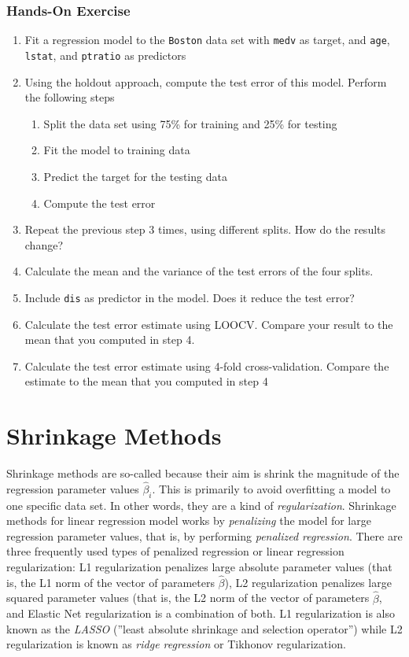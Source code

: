 \begin{tcolorbox}[colback=code]
\subsubsection*{Hands-On Exercise} 

\begin{enumerate}
  \item Fit a regression model to the \texttt{Boston} data set with \texttt{medv} as target, and \texttt{age}, \texttt{lstat}, and \texttt{ptratio} as predictors
  \item Using the holdout approach, compute the test error of this model. Perform the following steps
  \begin{enumerate}
     \item Split the data set using 75\% for training and 25\% for testing
     \item Fit the model to training data
     \item Predict the target for the testing data
     \item Compute the test error
  \end{enumerate}
  \item Repeat the previous step 3 times, using different splits. How do the results change?
  \item Calculate the mean and the variance of the test errors of the four splits. 
  \item Include \texttt{dis} as predictor in the model. Does it reduce the test error?
  \item Calculate the test error estimate using LOOCV. Compare your result to the mean that you computed in step 4.
  \item Calculate the test error estimate using 4-fold cross-validation. Compare the estimate to the mean that you computed in step 4
\end{enumerate}
\end{tcolorbox}

\section{Shrinkage Methods}

Shrinkage methods are so-called because their aim is shrink the magnitude of the regression parameter values $\hat{\beta}_i$. This is primarily to avoid overfitting a model to one specific data set. In other words, they are a kind of \emph{regularization}. Shrinkage methods for linear regression model works by \emph{penalizing} the model for large regression parameter values, that is, by performing \emph{penalized regression}. There are three frequently used types of penalized regression or linear regression regularization: L1 regularization penalizes large absolute parameter values (that is, the L1 norm of the vector of parameters $\hat{\beta}$), L2 regularization penalizes large squared parameter values (that is, the L2 norm of the vector of parameters $\hat{\beta}$, and Elastic Net regularization is a combination of both. L1 regularization is also known as the \emph{LASSO} (''least absolute shrinkage and selection operator'') while L2 regularization is known as \emph{ridge regression} or Tikhonov regularization. 


